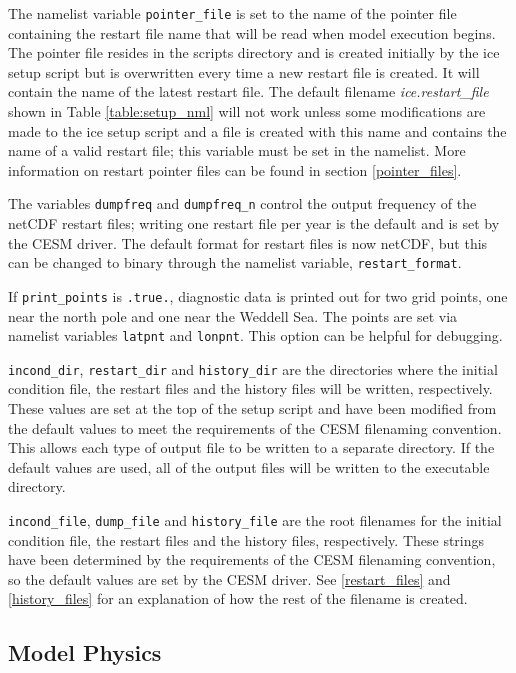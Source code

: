 The namelist variable {\tt pointer\_file} is set to the name of the pointer file
containing the restart file name that will be read when model execution
begins.  The pointer file resides in the scripts directory and is created 
initially by the ice setup script but is overwritten every time a new restart 
file is created.  It will contain the name of the latest restart file.  The 
default filename {\it ice.restart\_file} shown in Table 
\ref{table:setup_nml} will not work unless some modifications are made to 
the ice setup script and a file is created with this name and contains the name 
of a valid restart file; this variable must be set in the namelist.  More 
information on restart pointer files can be found in section \ref{pointer_files}.

The variables {\tt dumpfreq} and {\tt dumpfreq\_n} control the 
output frequency of the netCDF restart files; writing one restart file per 
year is the default and is set by the CESM driver. The default format for
restart files is now netCDF, but this can be changed to binary through
the namelist variable, {\tt restart\_format}.

If {\tt print\_points} is {\tt .true.}, diagnostic data is printed out for two
grid points, one near the north pole and one near the Weddell Sea.  The points
are set via namelist variables {\tt latpnt} and {\tt lonpnt}.  This option can 
be helpful for debugging.

{\tt incond\_dir}, {\tt restart\_dir} and {\tt history\_dir} are the directories
where the initial condition file, the restart files and the history files will
be written, respectively.  These values are set at the top of the setup script
and have been modified from the default values to meet the requirements of the
CESM filenaming convention.  This allows each type of output file to be written
to a separate directory.  If the default values are used, all of the output
files will be written to the executable directory.

{\tt incond\_file}, {\tt dump\_file} and {\tt history\_file} are the root
filenames for the initial condition file, the restart files and the history 
files, respectively.  These strings have been determined by the requirements 
of the CESM filenaming convention, so the default values are set by the CESM
driver.  See \ref{restart_files} and \ref{history_files} for an explanation 
of how the rest of the filename is created.

\subsection{Model Physics}

